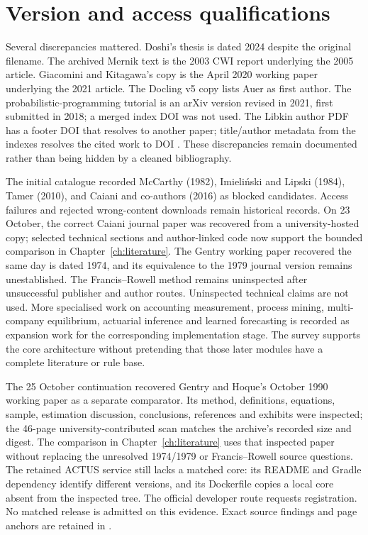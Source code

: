 \section{Version and access qualifications}

Several discrepancies mattered. Doshi's thesis is dated 2024 despite the
original filename. The archived Mernik text is the 2003 CWI report underlying
the 2005 article. Giacomini and Kitagawa's copy is the April 2020 working paper
underlying the 2021 article. The Docling v5 copy lists Auer as first author.
The probabilistic-programming tutorial is an arXiv version revised in 2021,
first submitted in 2018; a merged index DOI was not used. The Libkin author
PDF has a footer DOI that resolves to another paper; title/author metadata
from the indexes resolves the cited work to DOI
. These discrepancies remain documented rather
than being hidden by a cleaned bibliography.

The initial catalogue recorded McCarthy (1982), Imieliński and Lipski (1984),
Tamer (2010), and Caiani and co-authors (2016) as blocked candidates. Access
failures and rejected wrong-content downloads remain historical records. On
23 October, the correct Caiani journal paper was recovered from a
university-hosted copy; selected technical sections and author-linked code now
support the bounded comparison in Chapter~\ref{ch:literature}. The Gentry
working paper recovered the same day is dated 1974, and its equivalence to the
1979 journal version remains unestablished. The Francis--Rowell method remains
uninspected after unsuccessful publisher and author routes. Uninspected
technical claims are not used. More specialised work on accounting
measurement, process mining, multi-company equilibrium, actuarial inference
and learned forecasting is recorded as expansion work for the corresponding
implementation stage. The survey supports the core architecture without
pretending that those later modules have a complete literature or rule base.

The 25 October continuation recovered Gentry and Hoque's October 1990
working paper as a separate comparator. Its method, definitions, equations,
sample, estimation discussion, conclusions, references and exhibits were
inspected; the 46-page university-contributed scan matches the archive's
recorded size and digest. The comparison in Chapter~\ref{ch:literature}
uses that inspected paper without replacing the unresolved 1974/1979 or
Francis--Rowell source questions. The retained ACTUS service still lacks a
matched core: its README and Gradle dependency identify different versions,
and its Dockerfile copies a local core absent from the inspected tree.
The official developer route requests registration. No matched release is
admitted on this evidence. Exact source findings and page anchors are retained
in .


